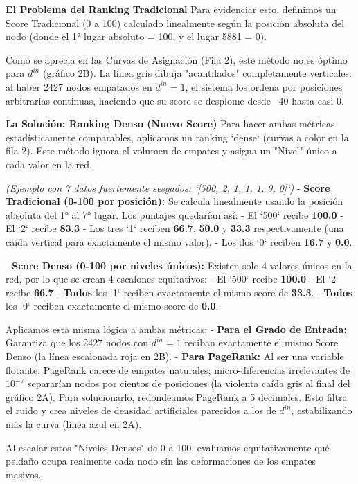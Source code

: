 \documentclass{article}
\begin{document}
\textbf{El Problema del Ranking Tradicional}  
Para evidenciar esto, definimos un Score Tradicional (0 a 100) calculado linealmente según la posición absoluta del nodo (donde el 1° lugar absoluto = 100, y el lugar 5881 = 0). 

Como se aprecia en las Curvas de Asignación (Fila 2), este método no es óptimo para $d^{in}$ (gráfico 2B). La línea gris dibuja "acantilados" completamente verticales: al haber 2427 nodos empatados en $d^{in} = 1$, el sistema los ordena por posiciones arbitrarias continuas, haciendo que su score se desplome desde ~40 hasta casi 0.

\textbf{La Solución: Ranking Denso (Nuevo Score)}
Para hacer ambas métricas estadísticamente comparables, aplicamos un ranking `dense` (curvas a color en la fila 2). Este método ignora el volumen de empates y asigna un "Nivel" único a cada valor en la red. 

\textit{(Ejemplo con 7 datos fuertemente sesgados: `[500, 2, 1, 1, 1, 0, 0]`)}
- \textbf{Score Tradicional (0-100 por posición):} Se calcula linealmente usando la posición absoluta del 1° al 7° lugar. Los puntajes quedarían así:
  - El `500` recibe \textbf{100.0}
  - El `2` recibe \textbf{83.3}
  - Los tres `1` reciben \textbf{66.7}, \textbf{50.0} y \textbf{33.3} respectivamente (una caída vertical para exactamente el mismo valor).
  - Los dos `0` reciben \textbf{16.7} y \textbf{0.0}.

- \textbf{Score Denso (0-100 por niveles únicos):} Existen solo 4 valores únicos en la red, por lo que se crean 4 escalones equitativos:
  - El `500` recibe \textbf{100.0}
  - El `2` recibe \textbf{66.7}
  - \textbf{Todos} los `1` reciben exactamente el mismo score de \textbf{33.3}.
  - \textbf{Todos} los `0` reciben exactamente el mismo score de \textbf{0.0}.


Aplicamos esta misma lógica a ambas métricas:
- \textbf{Para el Grado de Entrada:} Garantiza que los 2427 nodos con $d^{in} = 1$ reciban exactamente el mismo Score Denso (la línea escalonada roja en 2B).
- \textbf{Para PageRank:} Al ser una variable flotante, PageRank carece de empates naturales; micro-diferencias irrelevantes de $10^{-7}$ separarían nodos por cientos de posiciones (la violenta caída gris al final del gráfico 2A). Para solucionarlo, redondeamos PageRank a 5 decimales. Esto filtra el ruido y crea niveles de densidad artificiales parecidos a los de $d^{in}$, estabilizando más la curva (línea azul en 2A).

Al escalar estos "Niveles Densos" de 0 a 100, evaluamos equitativamente qué peldaño ocupa realmente cada nodo sin las deformaciones de los empates masivos.
\end{document}
